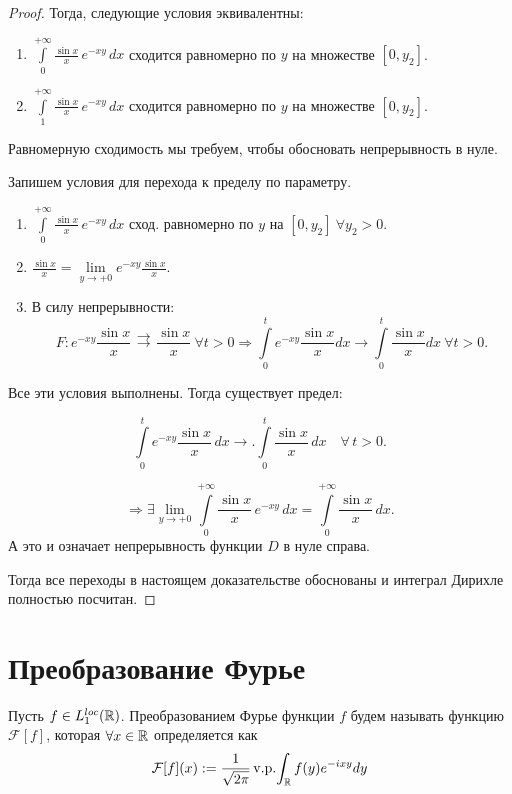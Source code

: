 \begin{proof}
\noindent Тогда, следующие условия эквивалентны:

\begin{enumerate}
    \item \(\int\limits_0^{+\infty} \frac{\sin x}{x} \, e^{-x y} \, dx \) сходится равномерно по \( y \) на множестве \( [0, y_2] \).

    \item \(\int\limits_1^{+\infty} \frac{\sin x}{x} \, e^{-x y} \, dx \) сходится равномерно по \( y \) на множестве \( [0, y_2] \).
\end{enumerate}

\noindent Равномерную сходимость мы требуем, чтобы обосновать непрерывность в нуле.

\noindent Запишем условия для перехода к пределу по параметру.

\begin{enumerate}
    \item $\int\limits_0^{+\infty} \frac{\sin x}{x} \, e^{-x y} \, dx$ сход. равномерно по $y$ на $[0, y_2 ] \ \forall y_2 > 0.$

    \item $\frac{\sin x}{x} = \lim\limits_{y \to +0} e^{-x y} \frac{\sin x}{x}.$


    \item В силу непрерывности:
    $$
    F: e^{-x y} \frac{\sin x}{x} \mathrel{\substack{\rightrightarrows \\ [0, t]}} \dfrac{\sin x}{x}  \ \forall t > 0 \Rightarrow \int\limits_{0}^{t} e^{-xy} \dfrac{\sin x}{x} dx \rightarrow \int\limits_{0}^{t} \dfrac{\sin x}{x} dx \ \forall t > 0.
    $$

\end{enumerate}

\noindent Все эти условия выполнены. Тогда существует предел:

\[
\int\limits_0^{t} e^{-x y} \frac{\sin x}{x} \, dx
\longrightarrow.
\int\limits_0^{t} \frac{\sin x}{x} \, dx \quad \forall\, t > 0.
\]


\[
\Rightarrow \exists \lim_{y \to +0} \int\limits_0^{+\infty} \frac{\sin x}{x} \, e^{-x y} \, dx
= \int\limits_0^{+\infty} \frac{\sin x}{x} \, dx.
\]
А это и означает непрерывность функции $D$ в нуле справа.

\noindent Тогда  все переходы в настоящем доказательстве обоснованы и интеграл Дирихле полностью посчитан.

\end{proof}


\section{Преобразование Фурье}
\begin{definition}
Пусть $f \in L_1^{loc}(\mathbb{R})$.
Преобразованием Фурье функции $f$ будем называть функцию $\mathcal{F}[f]$, которая $\forall x \in \mathbb{R}$ определяется как
\[
    \mathcal{F}[f](x) := \dfrac{1}{\sqrt {2\pi}}\mathop{\mathrm{v.p.}}\!\int_{\mathbb{R}} f(y)e^{-ixy}dy
\]
\end{definition}

